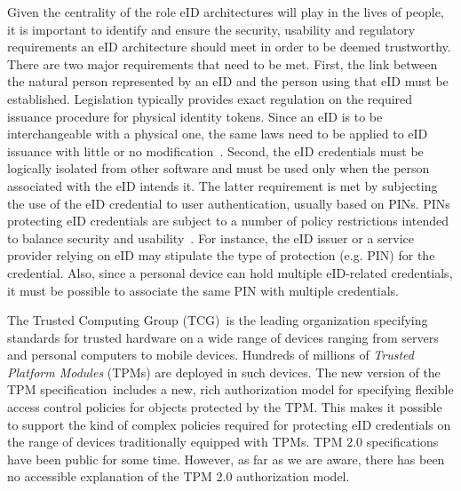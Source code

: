 \documentclass{sig-alternate-2013}
\begin{document}
Given the centrality of the role eID architectures will play in the
lives of people, it is important to identify and ensure the security,
usability and regulatory requirements an eID architecture should meet
in order to be deemed trustworthy. There are two major requirements
that need to be met. First, the link between the natural person
represented by an eID and the person using that eID must be
established. Legislation typically provides exact regulation on the
required issuance procedure for physical identity tokens. Since an eID
is to be interchangeable with a physical one, the same laws need to be
applied to eID issuance with little or no modification~\cite{Myhr08}.
Second, the eID credentials must be logically isolated from other
software and must be used only when the person associated with the eID
intends it. The latter requirement is met by subjecting the use of the
eID credential to user authentication, usually based on PINs. PINs
protecting eID credentials are subject to a number of policy
restrictions intended to balance security and
usability~\cite{Laitinen14}. For instance, the eID issuer or a service
provider relying on eID may stipulate the type of protection (e.g.
PIN) for the credential. Also, since a personal device can hold
multiple eID-related credentials, it must be possible to associate the
same PIN with multiple credentials.

The Trusted Computing Group (TCG)\footnotemark\ is the leading
organization specifying standards for trusted hardware on a wide range
of devices ranging from servers and personal computers to mobile
devices. Hundreds of millions of \emph{Trusted Platform Modules} (TPMs)
are deployed in such devices.  The new version of the TPM
specification\footnotemark\ includes a new, rich authorization model
for specifying flexible access control policies for objects protected
by the TPM\@. This makes it possible to support the kind of complex
policies required for protecting eID credentials on the range of
devices traditionally equipped with TPMs.  TPM 2.0 specifications have
been public for some time. However, as far as we are aware, there has
been no accessible explanation of the TPM 2.0 authorization model.

\end{document}
